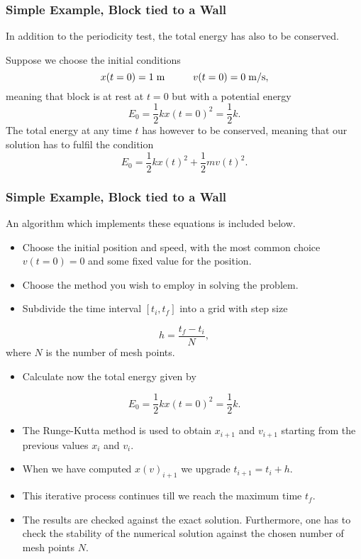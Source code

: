\documentclass{beamer}
\begin{document}
\begin{frame}
\frametitle{Simple Example, Block tied to a Wall}

\begin{block}{}
In addition to the periodicity test, the total energy has also to be conserved. 

Suppose we choose the initial conditions 
\[
     x(t=0)=1\hspace{0.1cm} \mathrm{m}\hspace{1cm} v(t=0)=0\hspace{0.1cm}\mathrm{m/s},
\]
meaning that block is at rest at $t=0$ but with a potential energy
\[
    E_0=\frac{1}{2}kx(t=0)^2=\frac{1}{2}k.
\]
The total energy at any time $t$ has however to be conserved, meaning that our solution has to fulfil the condition
\[
    E_0=\frac{1}{2}kx(t)^2+\frac{1}{2}mv(t)^2.
\]
\end{block}
\end{frame}

\begin{frame}
\frametitle{Simple Example, Block tied to a Wall}

\begin{block}{}
An algorithm which implements these equations is included below.
\begin{itemize}
 \item Choose the initial position and speed, with the most common choice $v(t=0)=0$ and some fixed value for the position. 

 \item Choose the method you wish to employ in solving the problem.

 \item Subdivide the time interval $[t_i,t_f] $ into a grid with step size
\end{itemize}

\noindent
       \[
	  h=\frac{t_f-t_i}{N},
      \]
where $N$ is the number of mesh points. 
\begin{itemize}
 \item Calculate now the total energy given by 
\end{itemize}

\noindent
  \[
    E_0=\frac{1}{2}kx(t=0)^2=\frac{1}{2}k.
  \]
\begin{itemize}
 \item The Runge-Kutta method is used to obtain $x_{i+1}$ and $v_{i+1}$ starting from the previous values $x_i$ and $v_i$.

 \item When we have computed $x(v)_{i+1}$ we upgrade  $t_{i+1}=t_i+h$.

 \item This iterative  process continues till we reach the maximum time $t_f$.

 \item The results are checked against the exact solution. Furthermore, one has to check the stability of the numerical solution against the chosen number of mesh points $N$.      
\end{itemize}

\noindent
\end{block}
\end{frame}
\end{document}
